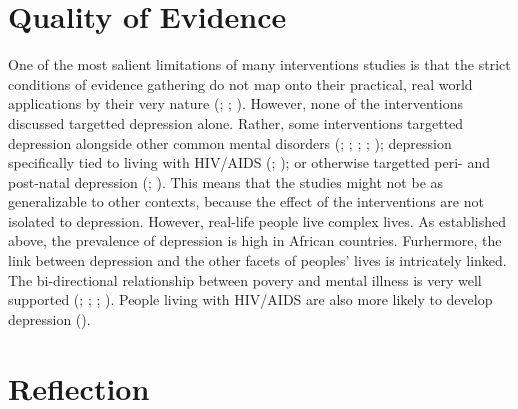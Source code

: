 \documentclass[stu,a4paper,12pt,donotrepeattitle]{apa7}
\begin{document}
\section{Quality of Evidence}
One of the most salient limitations of many interventions studies
is that the strict conditions of evidence gathering do not map onto their
practical, real world applications by their very nature (\cite{douketal21};
\cite{kaz14}; \cite{shed18}). However, none of the interventions discussed
targetted depression alone. Rather, some interventions targetted depression
alongside other common mental disorders (\cite{abasetal16}; \cite{chibandaetal11};
\cite{chibandaetal15}; \cite{chibandaetal16}; \cite{douketal21}); depression
specifically tied to living with HIV/AIDS (\cite{logetal18};
\cite{petersenetal14}); or otherwise targetted peri- and post-natal depression
(\cite{lunetal14}; \cite{nyatetal16}). This means that the studies might not be
as generalizable to other contexts, because the effect of the interventions are
not isolated to depression. However, real-life people live complex lives. As
established above, the prevalence of depression is high in African countries.
Furhermore, the link between depression and the other facets of peoples' lives
is intricately linked. The bi-directional relationship between povery and
mental illness is very well supported (\cite{lundetal10}; \cite{lund12};
\cite{ridetal20}; \cite{wahl17}). People living with HIV/AIDS are also
more likely to develop depression (\cite{logetal18}).
\section{Reflection}
\newpage
\printbibliography
\end{document}
